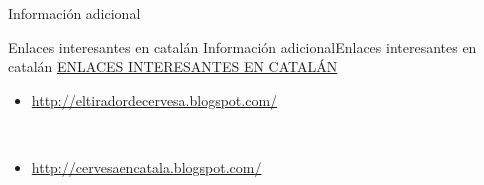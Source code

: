 \begin{frame}{Información adicional}
\protect\hypertarget{informaciuxf3n-adicional-2}{}
\begin{block}{Enlaces interesantes en catalán}
\protect\hypertarget{enlaces-interesantes-en-cataluxe1n}{}
Información adicionalEnlaces interesantes en catalán \uline{ENLACES
INTERESANTES EN CATALÁN}\\

\begin{itemize}
\item
  \url{http://eltiradordecervesa.blogspot.com/}\strut \\
\item
  \url{http://cervesaencatala.blogspot.com/}\strut \\
\end{itemize}
\end{block}
\end{frame}
